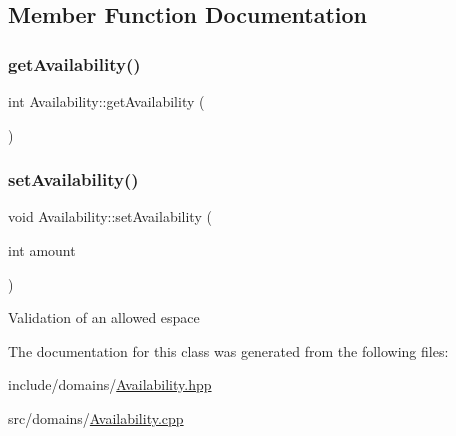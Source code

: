 \subsection{Member Function Documentation}
\mbox{\label{class_availability_a9775ae24b35cbe45a9b23b442f9112cd}} 
\subsubsection{\texorpdfstring{getAvailability()}{getAvailability()}}
{\footnotesize\ttfamily int Availability\+::get\+Availability (\begin{DoxyParamCaption}{ }\end{DoxyParamCaption})}

\mbox{\label{class_availability_a315634988dad6624afc1330bc77e08ae}} 
\subsubsection{\texorpdfstring{setAvailability()}{setAvailability()}}
{\footnotesize\ttfamily void Availability\+::set\+Availability (\begin{DoxyParamCaption}\item[{int}]{amount }\end{DoxyParamCaption})}

Validation of an allowed espace 

The documentation for this class was generated from the following files\+:\begin{DoxyCompactItemize}
\item 
include/domains/\mbox{\hyperlink{_availability_8hpp}{Availability.\+hpp}}\item 
src/domains/\mbox{\hyperlink{_availability_8cpp}{Availability.\+cpp}}\end{DoxyCompactItemize}
